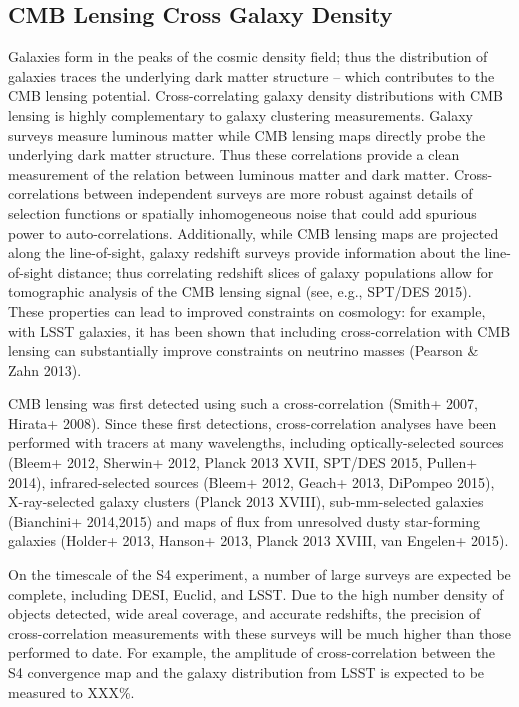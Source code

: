 \subsection{CMB Lensing Cross Galaxy Density}
Galaxies form in the peaks of the cosmic density field; thus the distribution of galaxies traces the underlying dark matter structure -- which contributes to the CMB lensing potential.
Cross-correlating galaxy density distributions with CMB lensing is highly complementary to galaxy clustering measurements.
Galaxy surveys measure luminous matter while CMB lensing maps directly probe the underlying dark matter structure. Thus these correlations provide a clean measurement of the relation between luminous matter and dark matter.
Cross-correlations between independent surveys are more robust against details of selection functions or spatially inhomogeneous noise that could add spurious power to auto-correlations.
Additionally, while CMB lensing maps are projected along the line-of-sight, galaxy redshift surveys provide information about the line-of-sight distance; thus correlating redshift slices of galaxy populations allow for tomographic analysis of the CMB lensing signal (see, e.g., SPT/DES 2015).
These properties can lead to improved constraints on cosmology: for example, with LSST galaxies, it has been shown that including cross-correlation with CMB lensing can substantially improve constraints on neutrino masses (Pearson \& Zahn 2013).


CMB lensing was first detected using such a cross-correlation (Smith+ 2007, Hirata+ 2008).  Since these first detections, cross-correlation analyses have been performed with tracers at many wavelengths, including optically-selected sources (Bleem+ 2012, Sherwin+ 2012, Planck 2013 XVII, SPT/DES 2015, Pullen+ 2014), infrared-selected sources (Bleem+ 2012, Geach+ 2013, DiPompeo 2015), X-ray-selected galaxy clusters (Planck 2013 XVIII), sub-mm-selected galaxies (Bianchini+ 2014,2015) and maps of flux from unresolved dusty star-forming galaxies (Holder+ 2013, Hanson+ 2013, Planck 2013 XVIII, van Engelen+ 2015). 

On the timescale of the S4 experiment, a number of large surveys are expected be complete, including DESI, Euclid, and LSST.  Due to the high number density of objects detected, wide areal coverage, and accurate redshifts, the precision of cross-correlation measurements with these surveys will be much higher than those performed to date.  For example, the amplitude of cross-correlation between the S4 convergence map and the galaxy distribution from LSST is expected to be measured to XXX\%.  

